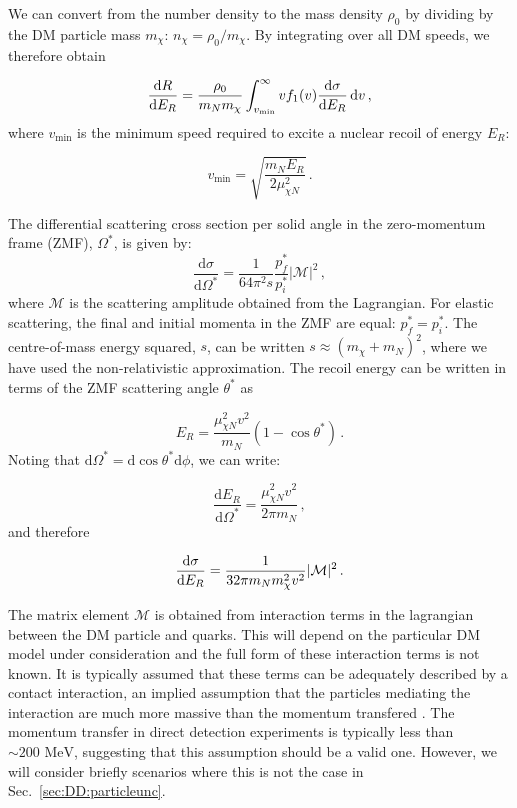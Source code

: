 We can convert from the number density to the mass density $\rho_0$ by dividing by the DM particle mass $m_\chi$: $n_\chi = \rho_0/m_\chi$. By integrating over all DM speeds, we therefore obtain

\begin{equation}
\frac{\mathrm{d}R}{\mathrm{d}E_R} =  \frac{\rho_0}{m_N m_\chi} \int_{v_\textrm{min}}^{\infty} v f_1(v) \frac{\mathrm{d}\sigma}{\mathrm{d}E_R} \, \mathrm{d}v\,,
\end{equation}
where $v_\textrm{min}$ is the minimum speed required to excite a nuclear recoil of energy $E_R$:

\begin{equation}
\label{eq:DD:vmin}
v_\textrm{min} = \sqrt{\frac{m_N E_R}{2 \mu_{\chi N}^2}}\,.
\end{equation}

The differential scattering cross section per solid angle in the zero-momentum frame (ZMF), \(\Omega^*\), is given by:
\begin{equation}
\frac{\textrm{d}\sigma}{\textrm{d}\Omega^*} = \frac{1}{64 \pi^2 s} \frac{p_f^*}{p_i^*} |\mathcal{M}|^2 \,,
\end{equation}
where $\mathcal{M}$ is the scattering amplitude obtained from the Lagrangian. For elastic scattering, the final and initial momenta in the ZMF are equal: \(p_f^* = p_i^*\). The centre-of-mass energy squared, \(s\), can be written \(s \approx (m_\chi + m_N)^2\), where we have used the non-relativistic approximation. The recoil energy can be written in terms of the ZMF scattering angle $\theta^*$ as \cite{Cerdeno:2010}

\begin{equation}
E_R = \frac{\mu_{\chi N }^2 v^2}{m_N} (1-\cos\theta^*)\,.
\end{equation}
Noting that $\textrm{d}\Omega^* = \textrm{d}\cos\theta^*\textrm{d}\phi$, we can write:

\begin{equation}
\frac{\textrm{d}E_R}{\textrm{d}\Omega^*} = \frac{\mu_{\chi N}^2 v^2}{2\pi m_N}\,,
\end{equation}
and therefore

\begin{equation}
\frac{\mathrm{d}\sigma}{\mathrm{d}E_R} = \frac{1}{32\pi m_N m_\chi^2 v^2}|\mathcal{M}|^2\,.
\end{equation}

The matrix element $\mathcal{M}$ is obtained from interaction terms in the lagrangian between the DM particle and quarks. This will depend on the particular DM model under consideration and the full form of these interaction terms is not known. It is typically assumed that these terms can be adequately described by a contact interaction, an implied assumption that the particles mediating the interaction are much more massive than the momentum transfered \cite{Fitzpatrick:2013}. The momentum transfer in direct detection experiments is typically less than $\sim 200 \textrm{ MeV}$, suggesting that this assumption should be a valid one. However, we will consider briefly scenarios where this is not the case in Sec.~\ref{sec:DD:particleunc}.

